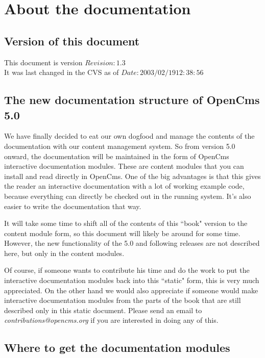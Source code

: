 \chapter{About the documentation}

\section{Version of this document}

This document is version $Revision: 1.3 $ \\
It was last changed in the CVS as of $Date: 2003/02/19 12:38:56 $ \\

\section{The new documentation structure of OpenCms 5.0}

We have finally decided to eat our own dogfood and manage the contents of the documentation 
with our content management system.
So from version 5.0 onward, the documentation will be maintained in the form of OpenCms 
interactive documentation modules.
These are content modules that you can install and read directly in OpenCms.
One of the big advantages is that this gives the reader an interactive documentation 
with a lot of working example code,
because everything can directly be checked out in the running system.
It's also easier to write the documentation that way.

It will take some time to shift all of the contents of this ``book" version to 
the content module form, so this document will likely be around for some time.
However, the new functionality of the 5.0 and following releases are not described here,
but only in the content modules.

Of course, if someone wants to contribute his time and do the work to 
put the interactive documentation modules back into this ``static" form, this is very much appreciated. 
On the other hand we would also appreciate if someone would make interactive documentation modules
from the parts of the book that are still described only in this static document.
Please send an email to {\em contributions@opencms.org} if you are interested in doing any of this.

\section{Where to get the documentation modules}

